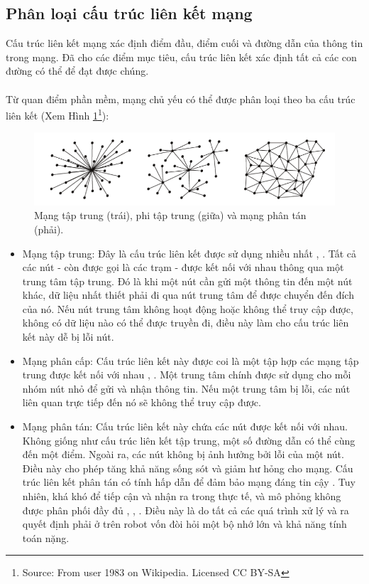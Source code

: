 \documentclass[11pt,openany]{book}
\begin{document}
\subsection{Phân loại cấu trúc liên kết mạng}
Cấu trúc liên kết mạng xác định điểm đầu, điểm cuối và đường dẫn của thông tin trong mạng. Đã cho các điểm mục tiêu, cấu trúc liên kết xác định tất cả các con đường có thể để đạt được chúng.\\\\
Từ quan điểm phần mềm, mạng chủ yếu có thể được phân loại theo ba cấu trúc liên kết (Xem Hình \ref{fig:4.2}\footnote{Source: From user 1983 on Wikipedia. Licensed CC BY-SA}):
\begin{figure}[H]
    \centering
    \includegraphics[scale=0.4]{assets/4_2.png}
    \caption{Mạng tập trung (trái), phi tập trung (giữa) và mạng phân tán (phải).}
    \label{fig:4.2}
\end{figure}
\begin{itemize}
    \item Mạng tập trung: Đây là cấu trúc liên kết được sử dụng nhiều nhất \cite{morgenthaler2012uavnet}, \cite{forster2013collaborative}. Tất cả các nút - còn được gọi là các trạm - được kết nối với nhau thông qua một trung tâm tập trung. Đó là khi một nút cần gửi một thông tin đến một nút khác, dữ liệu nhất thiết phải đi qua nút trung tâm để được chuyển đến đích của nó. Nếu nút trung tâm không hoạt động hoặc không thể truy cập được, không có dữ liệu nào có thể được truyền đi, điều này làm cho cấu trúc liên kết này dễ bị lỗi nút.
    \item Mạng phân cấp: Cấu trúc liên kết này được coi là một tập hợp các mạng tập trung được kết nối với nhau \cite{konolige2003map}, \cite{brand2014stereo}. Một trung tâm chính được sử dụng cho mỗi nhóm nút nhỏ để gửi và nhận thông tin. Nếu một trung tâm bị lỗi, các nút liên quan trực tiếp đến nó sẽ không thể truy cập được.
    \item Mạng phân tán: Cấu trúc liên kết này chứa các nút được kết nối với nhau. Không giống như cấu trúc liên kết tập trung, một số đường dẫn có thể cùng đến một điểm. Ngoài ra, các nút không bị ảnh hưởng bởi lỗi của một nút. Điều này cho phép tăng khả năng sống sót và giảm hư hỏng cho mạng. Cấu trúc liên kết phân tán có tính hấp dẫn để đảm bảo mạng đáng tin cậy \cite{cunningham2010ddf}. Tuy nhiên, khá khó để tiếp cận và nhận ra trong thực tế, và mô phỏng không được phân phối đầy đủ \cite{waharte2009coordinated}, \cite{cameron2009collaborative}, \cite{scherer2015autonomous}. Điều này là do tất cả các quá trình xử lý và ra quyết định phải ở trên robot vốn đòi hỏi một bộ nhớ lớn và khả năng tính toán nặng.
\end{itemize}
\end{document}
